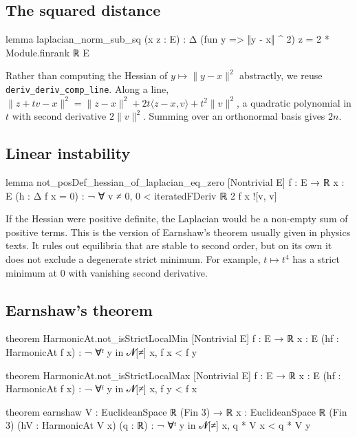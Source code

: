 \documentclass[11pt]{article}
\theoremstyle{remark}
\begin{document}
\subsection{The squared distance}\label{sec:quadratic}

\begin{lean}
lemma laplacian_norm_sub_sq (x z : E) :
    Δ (fun y => ‖y - x‖ ^ 2) z = 2 * Module.finrank ℝ E
\end{lean}

Rather than computing the Hessian of $y\mapsto\|y-x\|^2$ abstractly, we reuse
\texttt{deriv\_deriv\_comp\_line}. Along a line,
$\|z+tv-x\|^2=\|z-x\|^2+2t\langle z-x,v\rangle+t^2\|v\|^2$, a quadratic polynomial in $t$ with
second derivative $2\|v\|^2$. Summing over an orthonormal basis gives $2n$.

\subsection{Linear instability}\label{sec:linear}

\begin{lean}
lemma not_posDef_hessian_of_laplacian_eq_zero [Nontrivial E] {f : E → ℝ} {x : E}
    (h : Δ f x = 0) : ¬ ∀ v ≠ 0, 0 < iteratedFDeriv ℝ 2 f x ![v, v]
\end{lean}

If the Hessian were positive definite, the Laplacian would be a non-empty sum of positive terms.
This is the version of Earnshaw's theorem usually given in physics texts. It rules out equilibria
that are stable to second order, but on its own it does not exclude a degenerate strict minimum.
For example, $t\mapsto t^4$ has a strict minimum at $0$ with vanishing second derivative.

\subsection{Earnshaw's theorem}\label{sec:earnshaw}

\begin{lean}
theorem HarmonicAt.not_isStrictLocalMin [Nontrivial E] {f : E → ℝ} {x : E}
    (hf : HarmonicAt f x) : ¬ ∀ᶠ y in 𝓝[≠] x, f x < f y

theorem HarmonicAt.not_isStrictLocalMax [Nontrivial E] {f : E → ℝ} {x : E}
    (hf : HarmonicAt f x) : ¬ ∀ᶠ y in 𝓝[≠] x, f y < f x

theorem earnshaw {V : EuclideanSpace ℝ (Fin 3) → ℝ} {x : EuclideanSpace ℝ (Fin 3)}
    (hV : HarmonicAt V x) (q : ℝ) : ¬ ∀ᶠ y in 𝓝[≠] x, q * V x < q * V y
\end{lean}
\end{document}
